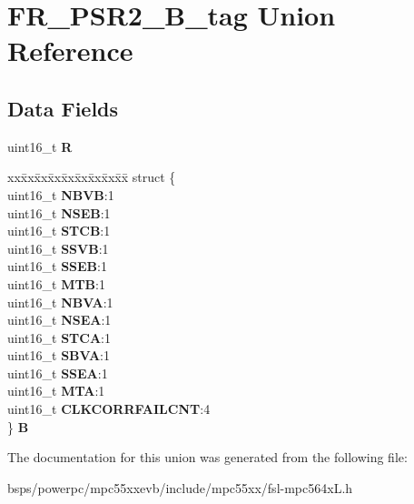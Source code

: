 \hypertarget{unionFR__PSR2__16B__tag}{}\section{F\+R\+\_\+\+P\+S\+R2\+\_\+B\+\_\+tag Union Reference}
\label{unionFR__PSR2__16B__tag}
\subsection*{Data Fields}
\begin{DoxyCompactItemize}
\item 
\mbox{\label{unionFR__PSR2__16B__tag_af990473c463829af396dbbc28b781a9b}} 
uint16\+\_\+t {\bfseries R}
\item 
\mbox{\label{unionFR__PSR2__16B__tag_a9b7bb457ae6cd3c40ef7c2d4ca2d2cb3}} 
\begin{tabbing}
xx\=xx\=xx\=xx\=xx\=xx\=xx\=xx\=xx\=\kill
struct \{\\
\>uint16\_t {\bfseries NBVB}:1\\
\>uint16\_t {\bfseries NSEB}:1\\
\>uint16\_t {\bfseries STCB}:1\\
\>uint16\_t {\bfseries SSVB}:1\\
\>uint16\_t {\bfseries SSEB}:1\\
\>uint16\_t {\bfseries MTB}:1\\
\>uint16\_t {\bfseries NBVA}:1\\
\>uint16\_t {\bfseries NSEA}:1\\
\>uint16\_t {\bfseries STCA}:1\\
\>uint16\_t {\bfseries SBVA}:1\\
\>uint16\_t {\bfseries SSEA}:1\\
\>uint16\_t {\bfseries MTA}:1\\
\>uint16\_t {\bfseries CLKCORRFAILCNT}:4\\
\} {\bfseries B}\\

\end{tabbing}\end{DoxyCompactItemize}


The documentation for this union was generated from the following file\+:\begin{DoxyCompactItemize}
\item 
bsps/powerpc/mpc55xxevb/include/mpc55xx/fsl-\/mpc564x\+L.\+h\end{DoxyCompactItemize}
